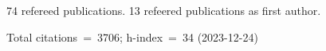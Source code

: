 74 refereed publications. 13 refeered publications as first author.

Total citations~=~3706; h-index~=~34 (2023-12-24)